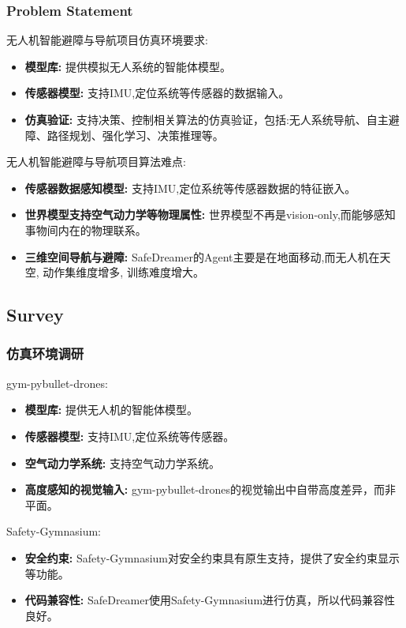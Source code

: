 \documentclass[10pt,mathserif]{beamer}%
\begin{document}
\begin{frame}[t, fragile]
    \frametitle{Problem Statement}
    \begin{spacing}{1.5}
		无人机智能避障与导航项目仿真环境要求:
		\begin{itemize}
	      \item \textbf{模型库:} 提供模拟无人系统的智能体模型。
            \item \textbf{传感器模型:} 支持IMU,定位系统等传感器的数据输入。
            \item \textbf{仿真验证:} 支持决策、控制相关算法的仿真验证，包括:无人系统导航、自主避障、路径规划、强化学习、决策推理等。
		\end{itemize}
        无人机智能避障与导航项目算法难点:
		\begin{itemize}
	      \item \textbf{传感器数据感知模型:} 支持IMU,定位系统等传感器数据的特征嵌入。
            \item \textbf{世界模型支持空气动力学等物理属性:} 世界模型不再是vision-only,而能够感知事物间内在的物理联系。
            \item \textbf{三维空间导航与避障:} SafeDreamer的Agent主要是在地面移动,而无人机在天空, 动作集维度增多, 训练难度增大。
		\end{itemize}
    \end{spacing}
   
\end{frame}

\subsection{Survey}

\begin{frame}[t, fragile]
    \frametitle{仿真环境调研}
    \begin{spacing}{1.5}
		gym-pybullet-drones:
		\begin{itemize}
	      \item \textbf{模型库:} 提供无人机的智能体模型。
            \item \textbf{传感器模型:} 支持IMU,定位系统等传感器。
            \item \textbf{空气动力学系统:} 支持空气动力学系统。
            \item \textbf{高度感知的视觉输入:} gym-pybullet-drones的视觉输出中自带高度差异，而非平面。
		\end{itemize}
        Safety-Gymnasium:
		\begin{itemize}
             \item \textbf{安全约束:} Safety-Gymnasium对安全约束具有原生支持，提供了安全约束显示等功能。
             \item \textbf{代码兼容性:} SafeDreamer使用Safety-Gymnasium进行仿真，所以代码兼容性良好。
		\end{itemize}
    \end{spacing}
   
\end{frame}
    
    
\end{document}
